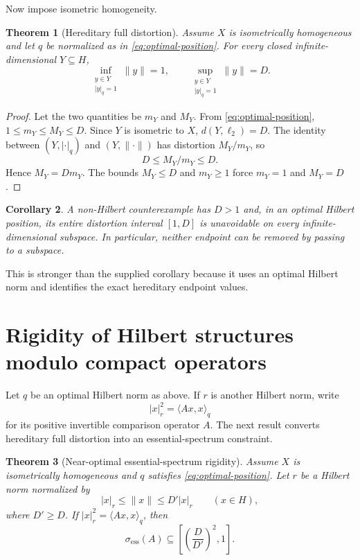 \documentclass[11pt]{article}
\newtheorem{theorem}{Theorem}[section]
\newtheorem{corollary}[theorem]{Corollary}
\theoremstyle{definition}
\begin{document}
Now impose isometric homogeneity.

\begin{theorem}[Hereditary full distortion]\label{thm:endpoints}
Assume $X$ is isometrically homogeneous and let $q$ be normalized as in
\eqref{eq:optimal-position}.  For every closed infinite-dimensional
$Y\subseteq H$,
\begin{equation}\label{eq:endpoints}
 \inf_{\substack{y\in Y\\|y|_q=1}}\|y\|=1,
 \qquad
 \sup_{\substack{y\in Y\\|y|_q=1}}\|y\|=D.
\end{equation}
\end{theorem}

\begin{proof}
Let the two quantities be $m_Y$ and $M_Y$.  From
\eqref{eq:optimal-position}, $1\leq m_Y\leq M_Y\leq D$.  Since $Y$ is
isometric to $X$, $d(Y,\ell_2)=D$.  The identity between $(Y,|\cdot|_q)$ and
$(Y,\|\cdot\|)$ has distortion $M_Y/m_Y$, so
\[
 D\leq M_Y/m_Y\leq D.
\]
Hence $M_Y=Dm_Y$.  The bounds $M_Y\leq D$ and $m_Y\geq1$ force
$m_Y=1$ and $M_Y=D$.
\end{proof}

\begin{corollary}\label{cor:counter-distortion}
A non-Hilbert counterexample has $D>1$ and, in an optimal Hilbert position,
its entire distortion interval $[1,D]$ is unavoidable on every
infinite-dimensional subspace.  In particular, neither endpoint can be
removed by passing to a subspace.
\end{corollary}

This is stronger than the supplied corollary because it uses an optimal
Hilbert norm and identifies the exact hereditary endpoint values.

\section{Rigidity of Hilbert structures modulo compact operators}
\label{sec:compact}

Let $q$ be an optimal Hilbert norm as above.  If $r$ is another Hilbert norm,
write
\[
 |x|_r^2=\langle Ax,x\rangle_q
\]
for its positive invertible comparison operator $A$.  The next result converts
hereditary full distortion into an essential-spectrum constraint.

\begin{theorem}[Near-optimal essential-spectrum rigidity]\label{thm:ess-spectrum}
Assume $X$ is isometrically homogeneous and $q$ satisfies
\eqref{eq:optimal-position}.  Let $r$ be a Hilbert norm normalized by
\[
 |x|_r\leq\|x\|\leq D'|x|_r
 \qquad(x\in H),
\]
where $D'\geq D$.  If $|x|_r^2=\langle Ax,x\rangle_q$, then
\begin{equation}\label{eq:ess-spectrum}
 \sigma_{\mathrm{ess}}(A)\subseteq
 \left[\left(\frac{D}{D'}\right)^2,1\right].
\end{equation}
\end{theorem}
\end{document}
